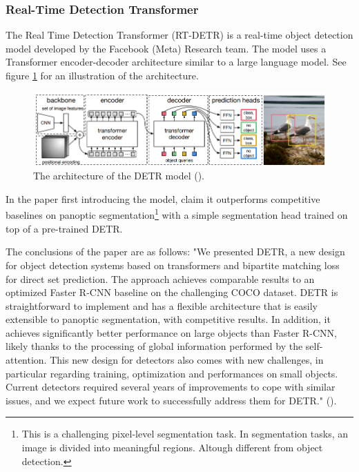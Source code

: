 
\subsubsection{Real-Time Detection Transformer}
\label{sec:rtdetr}
The Real Time Detection Transformer (RT-DETR) is a real-time object detection model developed by the Facebook (Meta) Research team. The model uses a Transformer encoder-decoder architecture similar to a large language model. See figure \ref{fig:detrarchitecture} for an illustration of the architecture.

\begin{figure}[H]
    \centering
    \includegraphics[width=1\linewidth]{Images/Diagrams/DETR2.png}
    \caption{The architecture of the DETR model (\cite{carion2020endtoend}).}
    \label{fig:detrarchitecture}
\end{figure}

In the paper first introducing the model, \citeauthor{carion2020endtoend} claim it outperforms competitive baselines on panoptic segmentation\footnote{This is a challenging pixel-level segmentation task. In segmentation tasks, an image is divided into meaningful regions. Altough different from object detection.} with a simple segmentation head trained on top of a pre-trained DETR. 

The conclusions of the paper are as follows:
"We presented DETR, a new design for object detection systems based on transformers and bipartite matching loss for direct set prediction. The approach achieves comparable results to an optimized Faster R-CNN baseline on the challenging COCO dataset. DETR is straightforward to implement and has a flexible architecture that is easily extensible to panoptic segmentation, with competitive results. In addition, it achieves significantly better performance on large objects than Faster R-CNN, likely thanks to the processing of global information performed by the self-attention. This new design for detectors also comes with new challenges, in particular regarding training,  optimization and performances on small objects. Current detectors required several years of improvements to cope with similar issues, and we expect future work to successfully address them for DETR." (\cite{carion2020endtoend}).

